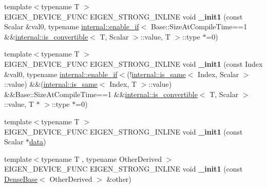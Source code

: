 \begin{DoxyCompactItemize}
\item 
\mbox{\label{class_eigen_1_1_plain_object_base_aaaad53bc947ff3a17af1eedbdeb3a788}} 
{\footnotesize template$<$typename T $>$ }\\E\+I\+G\+E\+N\+\_\+\+D\+E\+V\+I\+C\+E\+\_\+\+F\+U\+NC E\+I\+G\+E\+N\+\_\+\+S\+T\+R\+O\+N\+G\+\_\+\+I\+N\+L\+I\+NE void {\bfseries \+\_\+init1} (const Scalar \&val0, typename \mbox{\hyperlink{struct_eigen_1_1internal_1_1enable__if}{internal\+::enable\+\_\+if}}$<$ Base\+::\+Size\+At\+Compile\+Time==1 \&\&\mbox{\hyperlink{struct_eigen_1_1internal_1_1is__convertible}{internal\+::is\+\_\+convertible}}$<$ T, Scalar $>$\+::value, T $>$\+::type $\ast$=0)
\item 
\mbox{\label{class_eigen_1_1_plain_object_base_afab3b77a6c42316ef5dec874e443b3dc}} 
{\footnotesize template$<$typename T $>$ }\\E\+I\+G\+E\+N\+\_\+\+D\+E\+V\+I\+C\+E\+\_\+\+F\+U\+NC E\+I\+G\+E\+N\+\_\+\+S\+T\+R\+O\+N\+G\+\_\+\+I\+N\+L\+I\+NE void {\bfseries \+\_\+init1} (const Index \&val0, typename \mbox{\hyperlink{struct_eigen_1_1internal_1_1enable__if}{internal\+::enable\+\_\+if}}$<$(!\mbox{\hyperlink{struct_eigen_1_1internal_1_1is__same}{internal\+::is\+\_\+same}}$<$ Index, Scalar $>$\+::value) \&\&(\mbox{\hyperlink{struct_eigen_1_1internal_1_1is__same}{internal\+::is\+\_\+same}}$<$ Index, T $>$\+::value) \&\&Base\+::\+Size\+At\+Compile\+Time==1 \&\&\mbox{\hyperlink{struct_eigen_1_1internal_1_1is__convertible}{internal\+::is\+\_\+convertible}}$<$ T, Scalar $>$\+::value, T $\ast$ $>$\+::type $\ast$=0)
\item 
\mbox{\label{class_eigen_1_1_plain_object_base_aee83f415ba56df0e88cc27f6ffb19900}} 
{\footnotesize template$<$typename T $>$ }\\E\+I\+G\+E\+N\+\_\+\+D\+E\+V\+I\+C\+E\+\_\+\+F\+U\+NC E\+I\+G\+E\+N\+\_\+\+S\+T\+R\+O\+N\+G\+\_\+\+I\+N\+L\+I\+NE void {\bfseries \+\_\+init1} (const Scalar $\ast$\mbox{\hyperlink{class_eigen_1_1_plain_object_base_ac25699535374b1854cf8494e44ad31b2}{data}})
\item 
\mbox{\label{class_eigen_1_1_plain_object_base_a60a3568a35fcceadcf4cef655da09c7f}} 
{\footnotesize template$<$typename T , typename Other\+Derived $>$ }\\E\+I\+G\+E\+N\+\_\+\+D\+E\+V\+I\+C\+E\+\_\+\+F\+U\+NC E\+I\+G\+E\+N\+\_\+\+S\+T\+R\+O\+N\+G\+\_\+\+I\+N\+L\+I\+NE void {\bfseries \+\_\+init1} (const \mbox{\hyperlink{class_eigen_1_1_dense_base}{Dense\+Base}}$<$ Other\+Derived $>$ \&other)

\end{DoxyCompactItemize}
